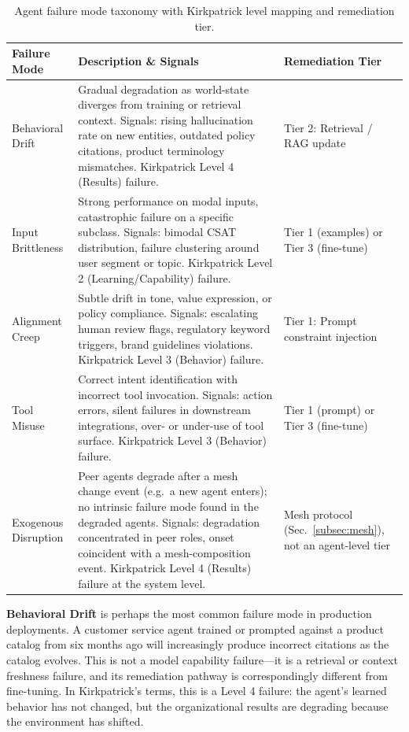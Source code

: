 \documentclass[conference]{IEEEtran}
\begin{document}
\begin{table}[t]
  \centering
  \caption{Agent failure mode taxonomy with Kirkpatrick level mapping and
           remediation tier.}
  \label{tab:taxonomy}
  \footnotesize
  \begin{tabular}{@{}L{1.4cm}L{3.6cm}L{2.1cm}@{}}
    \toprule
    \textbf{Failure Mode} & \textbf{Description \& Signals} &
    \textbf{Remediation Tier} \\
    \midrule
    Behavioral Drift &
    Gradual degradation as world-state diverges from training or retrieval
    context. Signals: rising hallucination rate on new entities, outdated
    policy citations, product terminology mismatches. Kirkpatrick Level 4
    (Results) failure. &
    Tier 2: Retrieval / RAG update \\
    \addlinespace
    Input Brittleness &
    Strong performance on modal inputs, catastrophic failure on a specific
    subclass. Signals: bimodal CSAT distribution, failure clustering around
    user segment or topic. Kirkpatrick Level 2 (Learning/Capability) failure. &
    Tier 1 (examples) or Tier 3 (fine-tune) \\
    \addlinespace
    Alignment Creep &
    Subtle drift in tone, value expression, or policy compliance. Signals:
    escalating human review flags, regulatory keyword triggers, brand
    guidelines violations. Kirkpatrick Level 3 (Behavior) failure. &
    Tier 1: Prompt constraint injection \\
    \addlinespace
    Tool Misuse &
    Correct intent identification with incorrect tool invocation. Signals:
    action errors, silent failures in downstream integrations, over- or
    under-use of tool surface. Kirkpatrick Level 3 (Behavior) failure. &
    Tier 1 (prompt) or Tier 3 (fine-tune) \\
    \addlinespace
    Exogenous Disruption &
    Peer agents degrade after a mesh change event (e.g.\ a new agent enters);
    no intrinsic failure mode found in the degraded agents. Signals:
    degradation concentrated in peer roles, onset coincident with a
    mesh-composition event. Kirkpatrick Level 4 (Results) failure at the
    system level. &
    Mesh protocol (Sec.~\ref{subsec:mesh}), not an agent-level tier \\
    \bottomrule
  \end{tabular}
\end{table}

\textbf{Behavioral Drift} is perhaps the most common failure mode in production
deployments. A customer service agent trained or prompted against a product
catalog from six months ago will increasingly produce incorrect citations as
the catalog evolves. This is not a model capability failure---it is a retrieval
or context freshness failure, and its remediation pathway is correspondingly
different from fine-tuning. In Kirkpatrick's terms, this is a Level 4 failure:
the agent's learned behavior has not changed, but the organizational results
are degrading because the environment has shifted.
\end{document}
